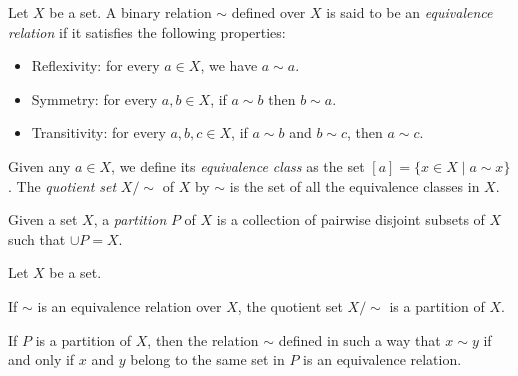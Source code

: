 \begin{definition}
Let $X$ be a set. A binary relation $\sim$ defined over $X$ is said to be an \emph{equivalence relation} if it satisfies the following properties:
\begin{itemize}
\item Reflexivity: for every $a\in X$, we have $a\sim a$.
\item Symmetry: for every $a,b \in X$, if $a\sim b$ then $b\sim a$.
\item Transitivity: for every $a,b,c\in X$, if $a\sim b$ and $b\sim c$, then $a\sim c$.
\end{itemize}
Given any $a\in X$, we define its \emph{equivalence class} as the set $[a] = \{x\in X \mid a\sim x\}$.
The \emph{quotient set} $X/{\sim}$ of $X$ by $\sim$ is the set of all the equivalence classes in $X$.
\label{<+label+>}
\end{definition}

\begin{definition}
Given a set $X$, a \emph{partition} $P$ of $X$ is a collection of pairwise disjoint subsets of $X$ such that $\cup P = X$. 
\end{definition}

\begin{proposition}
Let $X$ be a set.
\begin{statements}
\item If $\sim$ is an equivalence relation over $X$, the quotient set $X/{\sim}$ is a partition of $X$. 
\item If $P$ is a partition of $X$, then the relation $\sim$ defined in such a way that $x\sim y$ if and only if $x$ and $y$ belong to the same set in $P$ is an equivalence relation. 
\end{statements}
\end{proposition}

